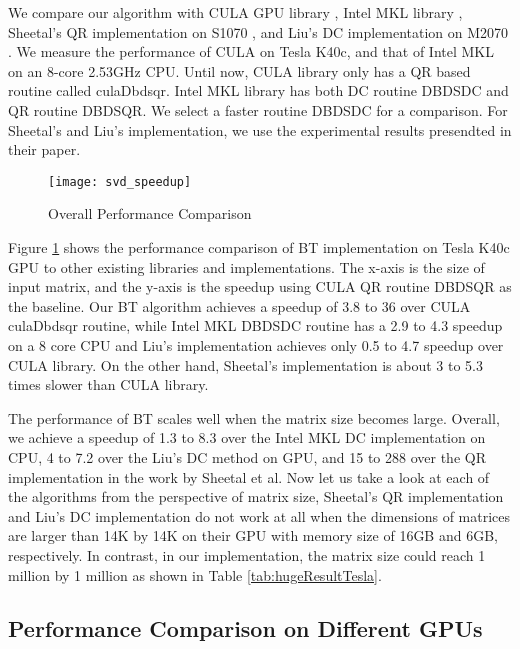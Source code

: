 We compare our algorithm with CULA GPU library \cite{cula}, Intel MKL library \cite{mkl}, Sheetal's QR implementation on S1070 \cite{09IPDPSQR}, and Liu's DC implementation on M2070 \cite{13CFDC}.
We measure the performance of CULA on Tesla K40c, and that of Intel MKL on an 8-core 2.53GHz CPU.
Until now, CULA library only has a QR based routine called culaDbdsqr.
Intel MKL library has both DC routine DBDSDC and QR routine DBDSQR. We select a faster routine DBDSDC for a comparison.
For Sheetal's \cite{09IPDPSQR} and Liu's \cite{13CFDC} implementation, we use the experimental results presendted in their paper. 

\begin{figure}[hbpt]
\vspace{-0.3in}
\centering
\texttt{[image: svd\_speedup]}
\vspace{-0.2in}
\caption{Overall Performance Comparison}
\label{fig:svd_speedup}
\vspace{-0.3in}
\end{figure}
Figure \ref{fig:svd_speedup} shows the performance comparison of BT
implementation on Tesla K40c GPU to other existing libraries
and implementations.
The x-axis is the size of input matrix, and the y-axis is the speedup
using CULA QR routine DBDSQR as the baseline.
Our BT algorithm achieves a speedup of 3.8 to 36 over CULA culaDbdsqr routine,
while Intel MKL DBDSDC routine has a 2.9 to 4.3 speedup on a 8 core CPU and Liu's implementation achieves only 0.5 to 4.7 speedup over CULA library.
On the other hand, Sheetal's implementation is about 3 to 5.3 times slower than CULA library.

The performance of BT scales well when the matrix size becomes large.
Overall, we achieve a speedup of 1.3 to 8.3 over the Intel MKL
DC implementation on CPU, 4 to 7.2 over the Liu's
DC method on GPU, and 15 to 288 over the QR implementation in the work by Sheetal et al.
Now let us take a look at each of the algorithms from the perspective of matrix size, Sheetal's QR implementation and Liu's DC implementation do not work at all when the dimensions of matrices are larger than 14K by 14K on their GPU with memory size of 16GB and 6GB, respectively. In contrast, in our implementation, the matrix size could reach 1 million by 1 million as shown in Table \ref{tab:hugeResultTesla}.

\vspace{-0.2in}
\subsection{Performance Comparison on Different GPUs}

